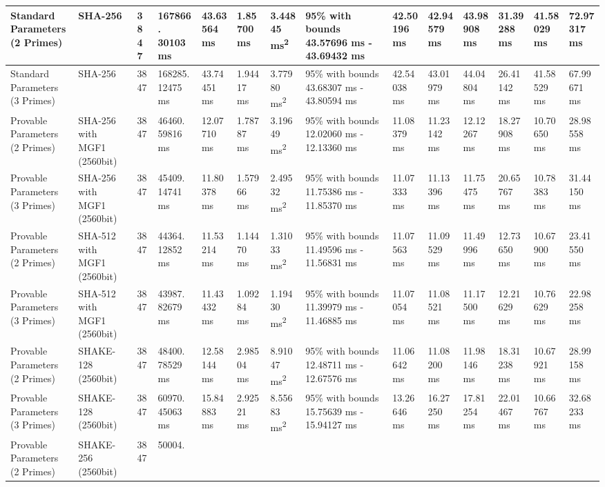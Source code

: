\documentclass[]{final_report}
\theoremstyle{definition}
\begin{document}
\begin{landscape}
\begin{longtable}{|p{2.3cm}|p{1.8cm}|p{1.0cm}|p{1.7cm}|p{1.4cm}|p{1.5cm}|p{1.8cm}|p{1.5cm}|p{1.43cm}|p{1.5cm}|p{1.3cm}|p{1.4cm}|p{1.3cm}|p{1.3cm}|}
\hline
\endlastfoot
Standard Parameters (2 Primes) & SHA-256 & 3847 & 167866.
30103 ms & 43.63564 ms & 1.85700 ms & 3.44845 ms\textsuperscript{2} & 95\% with bounds 43.57696 ms - 43.69432 ms & 42.50196 ms & 42.94579 ms & 43.98908 ms & 31.39288 ms & 41.58029 ms & 72.97317 ms \\
\hline
Standard Parameters (3 Primes) & SHA-256 & 3847 & 168285.
12475 ms & 43.74451 ms & 1.94417 ms & 3.77980 ms\textsuperscript{2} & 95\% with bounds 43.68307 ms - 43.80594 ms & 42.54038 ms & 43.01979 ms & 44.04804 ms & 26.41142 ms & 41.58529 ms & 67.99671 ms \\
\hline
Provable Parameters (2 Primes) & SHA-256 with MGF1 (2560bit) & 3847 & 46460.
59816 ms & 12.07710 ms & 1.78787 ms & 3.19649 ms\textsuperscript{2} & 95\% with bounds 12.02060 ms - 12.13360 ms & 11.08379 ms & 11.23142 ms & 12.12267 ms & 18.27908 ms & 10.70650 ms & 28.98558 ms \\
\hline
Provable Parameters (3 Primes) & SHA-256 with MGF1 (2560bit) & 3847 & 45409.
14741 ms & 11.80378 ms & 1.57966 ms & 2.49532 ms\textsuperscript{2} & 95\% with bounds 11.75386 ms - 11.85370 ms & 11.07333 ms & 11.13396 ms & 11.75475 ms & 20.65767 ms & 10.78383 ms & 31.44150 ms \\
\hline
Provable Parameters (2 Primes) & SHA-512 with MGF1 (2560bit) & 3847 & 44364.
12852 ms & 11.53214 ms & 1.14470 ms & 1.31033 ms\textsuperscript{2} & 95\% with bounds 11.49596 ms - 11.56831 ms & 11.07563 ms & 11.09529 ms & 11.49996 ms & 12.73650 ms & 10.67900 ms & 23.41550 ms \\
\hline
Provable Parameters (3 Primes) & SHA-512 with MGF1 (2560bit) & 3847 & 43987.
82679 ms & 11.43432 ms & 1.09284 ms & 1.19430 ms\textsuperscript{2} & 95\% with bounds 11.39979 ms - 11.46885 ms & 11.07054 ms & 11.08521 ms & 11.17500 ms & 12.21629 ms & 10.76629 ms & 22.98258 ms \\
\hline
Provable Parameters (2 Primes) & SHAKE-128 (2560bit) & 3847 & 48400.
78529 ms & 12.58144 ms & 2.98504 ms & 8.91047 ms\textsuperscript{2} & 95\% with bounds 12.48711 ms - 12.67576 ms & 11.06642 ms & 11.08200 ms & 11.98146 ms & 18.31238 ms & 10.67921 ms & 28.99158 ms \\
\hline
Provable Parameters (3 Primes) & SHAKE-128 (2560bit) & 3847 & 60970.
45063 ms & 15.84883 ms & 2.92521 ms & 8.55683 ms\textsuperscript{2} & 95\% with bounds 15.75639 ms - 15.94127 ms & 13.26646 ms & 16.27250 ms & 17.81254 ms & 22.01467 ms & 10.66767 ms & 32.68233 ms \\
\hline
Provable Parameters (2 Primes) & SHAKE-256 (2560bit) & 3847 & 50004.

\end{longtable}
\end{landscape}
\end{document}
